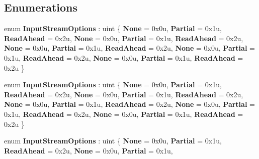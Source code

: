 \subsection*{Enumerations}
\begin{DoxyCompactItemize}
\item 
\mbox{\label{namespace_windows_1_1_storage_1_1_streams_a3d6f4be12cc7f53f38e7eca63196783c}} 
enum {\bfseries Input\+Stream\+Options} \+: uint \{ \newline
{\bfseries None} = 0x0u, 
{\bfseries Partial} = 0x1u, 
{\bfseries Read\+Ahead} = 0x2u, 
{\bfseries None} = 0x0u, 
\newline
{\bfseries Partial} = 0x1u, 
{\bfseries Read\+Ahead} = 0x2u, 
{\bfseries None} = 0x0u, 
{\bfseries Partial} = 0x1u, 
\newline
{\bfseries Read\+Ahead} = 0x2u, 
{\bfseries None} = 0x0u, 
{\bfseries Partial} = 0x1u, 
{\bfseries Read\+Ahead} = 0x2u, 
\newline
{\bfseries None} = 0x0u, 
{\bfseries Partial} = 0x1u, 
{\bfseries Read\+Ahead} = 0x2u
 \}
\item 
\mbox{\label{namespace_windows_1_1_storage_1_1_streams_a3d6f4be12cc7f53f38e7eca63196783c}} 
enum {\bfseries Input\+Stream\+Options} \+: uint \{ \newline
{\bfseries None} = 0x0u, 
{\bfseries Partial} = 0x1u, 
{\bfseries Read\+Ahead} = 0x2u, 
{\bfseries None} = 0x0u, 
\newline
{\bfseries Partial} = 0x1u, 
{\bfseries Read\+Ahead} = 0x2u, 
{\bfseries None} = 0x0u, 
{\bfseries Partial} = 0x1u, 
\newline
{\bfseries Read\+Ahead} = 0x2u, 
{\bfseries None} = 0x0u, 
{\bfseries Partial} = 0x1u, 
{\bfseries Read\+Ahead} = 0x2u, 
\newline
{\bfseries None} = 0x0u, 
{\bfseries Partial} = 0x1u, 
{\bfseries Read\+Ahead} = 0x2u
 \}
\item 
\mbox{\label{namespace_windows_1_1_storage_1_1_streams_a3d6f4be12cc7f53f38e7eca63196783c}} 
enum {\bfseries Input\+Stream\+Options} \+: uint \{ \newline
{\bfseries None} = 0x0u, 
{\bfseries Partial} = 0x1u, 
{\bfseries Read\+Ahead} = 0x2u, 
{\bfseries None} = 0x0u, 
\newline
{\bfseries Partial} = 0x1u, 

\end{DoxyCompactItemize}
